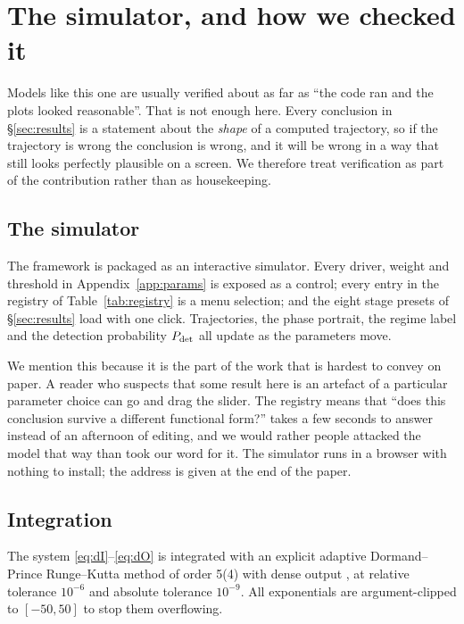 \section{The simulator, and how we checked it}
\label{sec:verification}

Models like this one are usually verified about as far as ``the code ran and the
plots looked reasonable''. That is not enough here. Every conclusion in
\S\ref{sec:results} is a statement about the \emph{shape} of a computed
trajectory, so if the trajectory is wrong the conclusion is wrong, and it will
be wrong in a way that still looks perfectly plausible on a screen. We therefore
treat verification as part of the contribution rather than as housekeeping.

\subsection{The simulator}

The framework is packaged as an interactive simulator. Every driver, weight and
threshold in Appendix~\ref{app:params} is exposed as a control; every entry in
the registry of Table~\ref{tab:registry} is a menu selection; and the eight
stage presets of \S\ref{sec:results} load with one click. Trajectories, the
phase portrait, the regime label and the detection probability $P_{\mathrm{det}}$ all
update as the parameters move.

We mention this because it is the part of the work that is hardest to convey on
paper. A reader who suspects that some result here is an artefact of a
particular parameter choice can go and drag the slider. The registry means that
``does this conclusion survive a different functional form?'' takes a few
seconds to answer instead of an afternoon of editing, and we would rather people
attacked the model that way than took our word for it. The simulator runs in a
browser with nothing to install; the address is given at the end of the paper.

\subsection{Integration}

The system \eqref{eq:dI}--\eqref{eq:dO} is integrated with an explicit adaptive
Dormand--Prince Runge--Kutta method of order 5(4) with dense output
\citep{dormand1980,virtanen2020scipy,harris2020numpy}, at relative tolerance
$10^{-6}$ and absolute tolerance $10^{-9}$. All exponentials are
argument-clipped to $[-50,50]$ to stop them overflowing.

